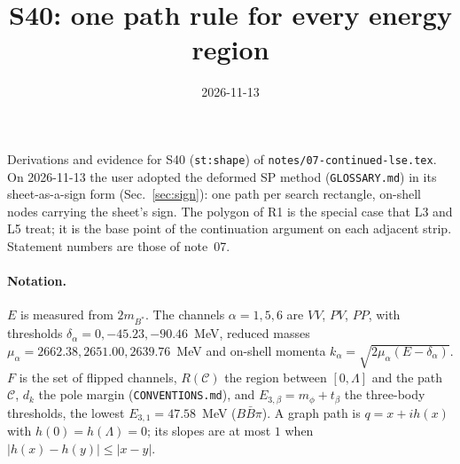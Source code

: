 \documentclass[11pt]{article}
\title{S40: one path rule for every energy region}
\author{}
\date{2026-11-13}
\newcommand{\file}[1]{\nolinkurl{#1}}
\begin{document}
\maketitle

\noindent Derivations and evidence for S40 (\texttt{st:shape}) of \file{notes/07-continued-lse.tex}. On 2026-11-13 the user adopted the deformed SP method (\file{GLOSSARY.md}) in its sheet-as-a-sign form (Sec.~\ref{sec:sign}): one path per search rectangle, on-shell nodes carrying the sheet's sign. The polygon of R1 is the special case that L3 and L5 treat; it is the base point of the continuation argument on each adjacent strip. Statement numbers are those of note~07.

\paragraph{Notation.} $E$ is measured from $2m_{B^*}$. The channels $\alpha=1,5,6$ are $VV$, $PV$, $PP$, with thresholds $\delta_\alpha=0,-45.23,-90.46$~MeV, reduced masses $\mu_\alpha=2662.38,2651.00,2639.76$~MeV and on-shell momenta $k_\alpha=\sqrt{2\mu_\alpha(E-\delta_\alpha)}$. $F$ is the set of flipped channels, $R(\mathcal C)$ the region between $[0,\Lambda]$ and the path $\mathcal C$, $d_k$ the pole margin (\file{CONVENTIONS.md}), and $E_{3,\beta}=m_\phi+t_\beta$ the three-body thresholds, the lowest $E_{3,1}=47.58$~MeV ($B\bar B\pi$). A graph path is $q=x+ih(x)$ with $h(0)=h(\Lambda)=0$; its slopes are at most $1$ when $|h(x)-h(y)|\le|x-y|$.
\end{document}
